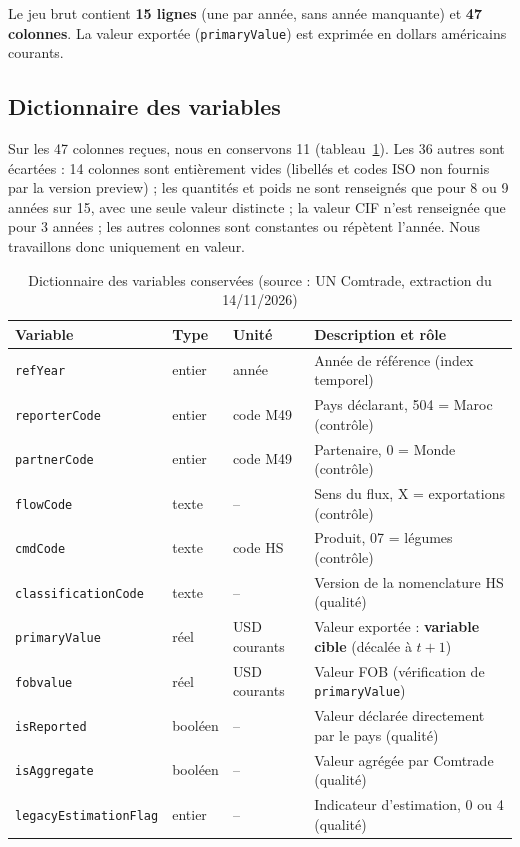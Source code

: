 \documentclass[11pt,a4paper]{article}
\begin{document}
Le jeu brut contient \textbf{15 lignes} (une par année, sans année manquante) et \textbf{47 colonnes}. La valeur exportée (\texttt{primaryValue}) est exprimée en dollars américains courants.

\subsection{Dictionnaire des variables}
Sur les 47 colonnes reçues, nous en conservons 11 (tableau~\ref{tab:variables}). Les 36 autres sont écartées : 14 colonnes sont entièrement vides (libellés et codes ISO non fournis par la version preview) ; les quantités et poids ne sont renseignés que pour 8 ou 9 années sur 15, avec une seule valeur distincte ; la valeur CIF n'est renseignée que pour 3 années ; les autres colonnes sont constantes ou répètent l'année. Nous travaillons donc uniquement en valeur.

\begin{table}[H]\centering\small
\caption{Dictionnaire des variables conservées (source : UN Comtrade, extraction du 14/11/2026)}\label{tab:variables}
\begin{tabular}{lllp{6.3cm}}\toprule
Variable & Type & Unité & Description et rôle\\\midrule
\texttt{refYear} & entier & année & Année de référence (index temporel)\\
\texttt{reporterCode} & entier & code M49 & Pays déclarant, 504 = Maroc (contrôle)\\
\texttt{partnerCode} & entier & code M49 & Partenaire, 0 = Monde (contrôle)\\
\texttt{flowCode} & texte & -- & Sens du flux, X = exportations (contrôle)\\
\texttt{cmdCode} & texte & code HS & Produit, 07 = légumes (contrôle)\\
\texttt{classificationCode} & texte & -- & Version de la nomenclature HS (qualité)\\
\texttt{primaryValue} & réel & USD courants & Valeur exportée : \textbf{variable cible} (décalée à $t+1$)\\
\texttt{fobvalue} & réel & USD courants & Valeur FOB (vérification de \texttt{primaryValue})\\
\texttt{isReported} & booléen & -- & Valeur déclarée directement par le pays (qualité)\\
\texttt{isAggregate} & booléen & -- & Valeur agrégée par Comtrade (qualité)\\
\texttt{legacyEstimationFlag} & entier & -- & Indicateur d'estimation, 0 ou 4 (qualité)\\
\bottomrule\end{tabular}
\end{table}
\end{document}
